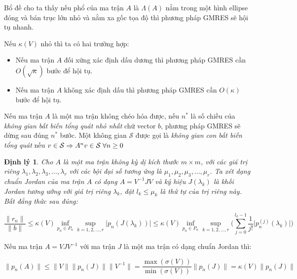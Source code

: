 \documentclass[14pt, a4paper]{article}
\numberwithin{equation}{section}
\numberwithin{algorithm}{section}
\numberwithin{figure}{section}
\newtheorem{dl}{Định lý}
\numberwithin{dl}{section}
\numberwithin{md}{section}
\numberwithin{bd}{section}
\numberwithin{dn}{section}
\numberwithin{hq}{section}
\begin{document}
Bổ đề cho ta thấy nếu phổ của ma trận $A$ là $\Lambda(A)$ nằm trong một hình ellipse đóng và bán trục lớn nhỏ và nằm xa gốc tọa độ thì phương pháp GMRES sẽ hội tụ nhanh.

Nếu $\kappa(V)$ nhỏ thì ta có hai trường hợp:
\begin{itemize}
    \item Nếu ma trận $A$ đối xứng xác định dấu dương thì phương pháp GMRES cần $O(\sqrt{\kappa})$ bước để hội tụ.
    \item Nếu ma trận $A$ không xác định dấu thì phương pháp GMRES cần $O(\kappa)$ bước để hội tụ.
\end{itemize}

Nếu ma trận $A$ là một ma trận không chéo hóa được, nếu $n^{*}$ là số chiều của \textit{không gian bất biến tổng quát nhỏ nhất} chứ vector $b$, phương pháp GMRES sẽ dừng sau đúng $n^{*}$ bước. Một không gian $\mathcal{S}$ được gọi là \textit{không gian con bất biến tổng quát} nếu $v \in \mathcal{S} \Rightarrow A^{n}v \in \mathcal{S} \thickspace \forall n \geq 0$ 

\begin{dl} \label{dl:Jordan-Residual-Bound}
    Cho $A$ là một ma trận không kỳ dị kích thước $m \times m$, với các giá trị riêng $\lambda_1, \lambda_2, \lambda_3, \dots, \lambda_r$ với các bội đại số tương ứng là $\mu_1, \mu_2, \mu_3, \dots, \mu_r$. Ta xét dạng chuẩn Jordan của ma trận $A$ có dạng $A=V^{-1}JV$ và ký hiệu $J(\lambda_k)$ là khối Jordan tương ướng với giá trị riêng $\lambda_k$, đặt $l_k \leq \mu_k$ là thứ tự của trị riêng này. Bất đẳng thức sau đúng:

    \begin{equation}
        \dfrac{\lVert r_n \rVert}{\lVert b \rVert} \leq \kappa(V) \inf_{p_n \in P_n} \sup_{k=1,2,\dots,r} \lvert p_n(J(\lambda_k)) \rvert \leq \kappa(V) \inf_{p_n \in P_n} \sup_{k=1,2,\dots,r} \Bigg( \sum_{j=0}^{l_k - 1} \dfrac{1}{j!} \lvert p_n^{(j)}(\lambda_k) \rvert \Bigg)
    \end{equation}
\end{dl}

Nếu ma trận $A=VJV^{-1}$ với ma trận $J$ là một ma trận có dạng chuẩn Jordan thì:

\begin{equation}
    \lVert p_n(A) \rVert \leq \lVert V \rVert \lVert p_n(J) \rVert \lVert V^{-1} \rVert=\dfrac{\max(\sigma(V))}{\min(\sigma(V))} \lVert p_n(J) \rVert = \kappa(V) \lVert p_n(J) \rVert
\end{equation}
\end{document}
